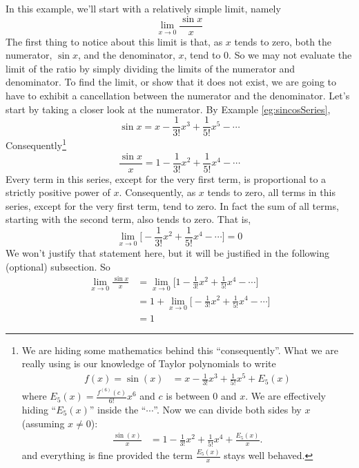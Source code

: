 \begin{eg}\label{eg:TaylorlimitA}
In this example, we'll start with a relatively simple limit, namely
\begin{equation*}
\lim_{x\rightarrow 0}\frac{\sin x}{x}
\end{equation*}
The first thing to notice about this limit is that, as $x$ tends to zero,
both the numerator, $\sin x$, and the denominator, $x$, tend to $0$.
So we may not evaluate the limit of the ratio by simply dividing
the limits of the numerator and denominator.
To find the limit, or show that it does not exist,
we are going to have to exhibit a cancellation between the numerator and
the denominator. Let's start by taking a closer look at
the numerator. By Example \ref{eg:sincosSeries},
\begin{equation*}
\sin x = x-\frac{1}{3!}x^3+\frac{1}{5!}x^5 - \cdots
\end{equation*}
Consequently\footnote{We are hiding some mathematics behind this ``consequently''. What we are really using is
our knowledge of Taylor polynomials to write
\begin{align*}
  f(x) = \sin(x) &= x-\frac{1}{3!}x^3+\frac{1}{5!}x^5 + E_5(x)
\end{align*}
where $E_5(x) = \frac{f^{(6)}(c)}{6!} x^6$ and $c$ is between 0 and $x$. We are effectively hiding ``$E_5(x)$'' inside
the ``$\cdots$''. Now we can divide both sides by $x$ (assuming $x \neq 0$):
\begin{align*}
\frac{\sin(x)}{x} &= 1-\frac{1}{3!}x^2+\frac{1}{5!}x^4 + \frac{E_5(x)}{x}.
\end{align*}
and everything is fine provided the term $\frac{E_5(x)}{x}$ stays well behaved.
}
\begin{equation*}
\frac{\sin x}{x}=1-\frac{1}{3!}x^2 + \frac{1}{5!}x^4 - \cdots
\end{equation*}
Every term in this series, except for the very first term, is
proportional to a strictly positive power of $x$.
Consequently, as $x$ tends to zero, all terms in this series, except for the
very first term, tend to zero. In fact the sum of all terms,
starting with the second term, also tends to zero. That is,
\begin{equation*}
\lim_{x\rightarrow 0}\Big[-\frac{1}{3!}x^2 + \frac{1}{5!}x^4 - \cdots\Big]
=0
\end{equation*}
We won't justify that statement here, but it will be justified
in the following (optional) subsection. So
\begin{align*}
\lim_{x\rightarrow 0}\frac{\sin x}{x}
& =\lim_{x\rightarrow 0}\Big[1-\frac{1}{3!}x^2 + \frac{1}{5!}x^4 - \cdots\Big]
\\
&=1+\lim_{x\rightarrow 0}\Big[-\frac{1}{3!}x^2 + \frac{1}{5!}x^4 - \cdots\Big]
\\
&=1
\end{align*}
\end{eg}

